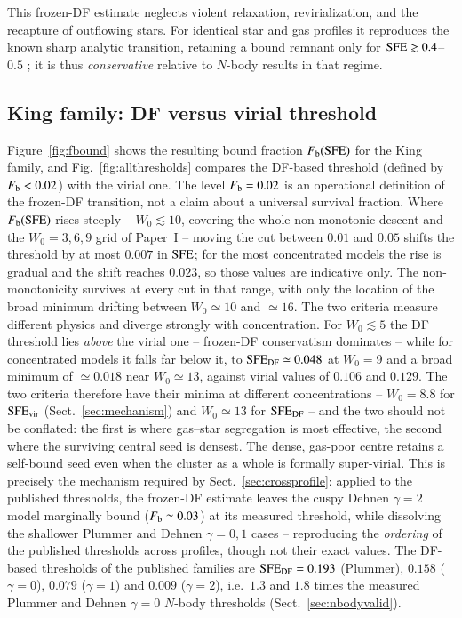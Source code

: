 \documentclass{aa}
\newcommand{\sfe}{{\rm SFE}}
\begin{document}
This frozen-DF estimate neglects violent relaxation, revirialization,
and the recapture of outflowing stars. For identical star and gas
profiles it reproduces the known sharp analytic transition, retaining a
bound remnant only for $\sfe\gtrsim0.4$--$0.5$
\citep{BoilyKroupa2003a}; it is thus \emph{conservative} relative to
$N$-body results in that regime.

\subsection{King family: DF versus virial threshold}
\label{sec:dfking}

Figure~\ref{fig:fbound} shows the resulting bound fraction
$F_{\rm b}(\sfe)$ for the King family, and Fig.~\ref{fig:allthresholds}
compares the DF-based threshold (defined by $F_{\rm b}<0.02$) with the
virial one. The level $F_{\rm b}=0.02$ is an operational definition of
the frozen-DF transition, not a claim about a universal survival
fraction. Where $F_{\rm b}(\sfe)$ rises steeply -- $W_0\lesssim10$,
covering the whole non-monotonic descent and the $W_0=3,6,9$ grid of
Paper~I -- moving the cut between $0.01$ and $0.05$ shifts the threshold
by at most $0.007$ in $\sfe$; for the most concentrated models the rise
is gradual and the shift reaches $0.023$, so those values are indicative
only. The non-monotonicity survives at every cut in that range, with
only the location of the broad minimum drifting between $W_0\simeq10$
and $\simeq16$. The two criteria measure
different physics and diverge
strongly with concentration. For $W_0\lesssim5$ the DF threshold lies
\emph{above} the virial one -- frozen-DF conservatism dominates -- while
for concentrated models it falls far below it, to
$\sfe_{\rm DF}\simeq0.048$ at $W_0=9$ and a broad minimum of
$\simeq0.018$ near $W_0\simeq13$, against virial values of $0.106$ and
$0.129$. The two criteria therefore have their minima at different
concentrations -- $W_0=8.8$ for $\sfe_{\rm vir}$
(Sect.~\ref{sec:mechanism}) and $W_0\simeq13$ for $\sfe_{\rm DF}$ -- and
the two should not be conflated: the first is where gas--star segregation
is most effective, the second where the surviving central seed is
densest. The dense, gas-poor centre retains a self-bound seed even when
the cluster as a whole is formally super-virial. This is precisely the
mechanism required by Sect.~\ref{sec:crossprofile}: applied to the
published thresholds, the frozen-DF estimate leaves the cuspy Dehnen
$\gamma=2$ model marginally bound ($F_{\rm b}\simeq0.03$) at its
measured threshold, while dissolving the shallower Plummer and Dehnen
$\gamma=0,1$ cases -- reproducing the \emph{ordering} of the published
thresholds across profiles, though not their exact values. The
DF-based thresholds of the published families are
$\sfe_{\rm DF}=0.193$ (Plummer), $0.158$ ($\gamma=0$),
$0.079$ ($\gamma=1$) and $0.009$ ($\gamma=2$), i.e.\ $1.3$ and $1.8$
times the measured Plummer and Dehnen $\gamma=0$ $N$-body thresholds
(Sect.~\ref{sec:nbodyvalid}).
\end{document}
